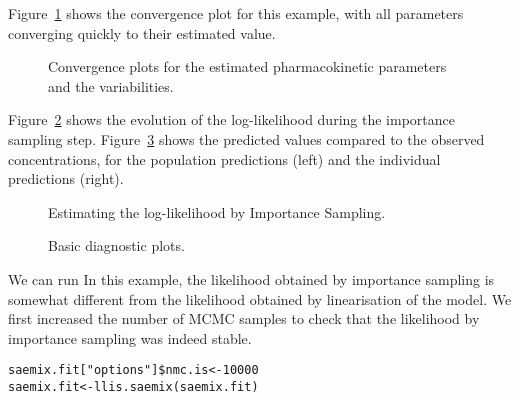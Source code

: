 
Figure~\ref{fig:convergPD} shows the convergence plot for this example, with all parameters converging quickly to their estimated value. 

\begin{figure}[!h]
\begin{center}
\par \kern -1cm
\end{center}
\par \kern -0.5cm
\caption{Convergence plots for the estimated pharmacokinetic parameters and the variabilities.} \label{fig:convergPD}
\end{figure}

Figure~\ref{fig:LLIS} shows the evolution of the log-likelihood during the importance sampling step. Figure~\ref{fig:PDdiagnos} shows the predicted values compared to the observed concentrations, for the population predictions (left) and the individual predictions (right).

\begin{figure}[!h]
\begin{center}
\par \kern -1cm
\end{center}
\par \kern -0.5cm
\caption{Estimating the log-likelihood by Importance Sampling.} \label{fig:LLIS}
\end{figure}

\begin{figure}[!h]
\begin{center}
\par \kern -1cm
\end{center}
\par \kern -0.5cm
\caption{Basic diagnostic plots.} \label{fig:PDdiagnos}
\end{figure}

We can run 
In this example, the likelihood obtained by importance sampling is somewhat different from the likelihood obtained by linearisation of the model. We first increased the number of MCMC samples to check that the likelihood by importance sampling was indeed stable.
\par \kern -0.3cm
\begin{verbatim}
saemix.fit["options"]$nmc.is<-10000
saemix.fit<-llis.saemix(saemix.fit)
\end{verbatim}

